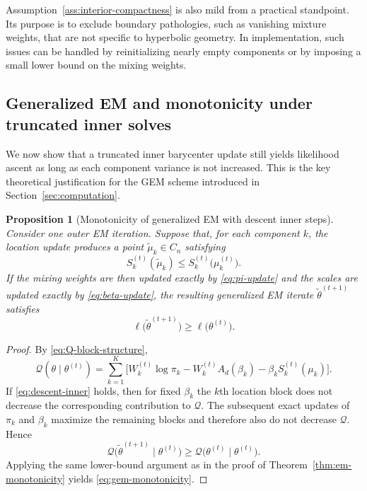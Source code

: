 \documentclass[11pt]{article}
\newtheorem{proposition}[theorem]{Proposition}
\begin{document}
Assumption~\ref{ass:interior-compactness} is also mild from a practical standpoint. Its purpose is to exclude boundary pathologies, such as vanishing mixture weights, that are not specific to hyperbolic geometry. In implementation, such issues can be handled by reinitializing nearly empty components or by imposing a small lower bound on the mixing weights.

\subsection{Generalized EM and monotonicity under truncated inner solves}\label{subsec:gem-theory}

We now show that a truncated inner barycenter update still yields likelihood ascent as long as each component variance is not increased. This is the key theoretical justification for the GEM scheme introduced in Section~\ref{sec:computation}.

\begin{proposition}[Monotonicity of generalized EM with descent inner steps]\label{prop:gem-monotone}
Consider one outer EM iteration. Suppose that, for each component \(k\), the location update produces a point \(\widetilde{\mu}_k\in C_n\) satisfying
\begin{equation}\label{eq:descent-inner}
S_k^{(t)}(\widetilde{\mu}_k)\le S_k^{(t)}\bigl(\mu_k^{(t)}\bigr).
\end{equation}
If the mixing weights are then updated exactly by \eqref{eq:pi-update} and the scales are updated exactly by \eqref{eq:beta-update}, the resulting generalized EM iterate \(\widetilde{\theta}^{(t+1)}\) satisfies
\begin{equation}\label{eq:gem-monotonicity}
\ell\bigl(\widetilde{\theta}^{(t+1)}\bigr)\ge \ell\bigl(\theta^{(t)}\bigr).
\end{equation}
\end{proposition}

\begin{proof}
By \eqref{eq:Q-block-structure},
\[
\mathcal{Q}(\theta\mid\theta^{(t)})
=
\sum_{k=1}^K
\Big[
W_k^{(t)}\log\pi_k
-
W_k^{(t)}A_d(\beta_k)
-
\beta_k S_k^{(t)}(\mu_k)
\Big].
\]
If \eqref{eq:descent-inner} holds, then for fixed \(\beta_k\) the \(k\)th location block does not decrease the corresponding contribution to \(\mathcal{Q}\). The subsequent exact updates of \(\pi_k\) and \(\beta_k\) maximize the remaining blocks and therefore also do not decrease \(\mathcal{Q}\). Hence
\[
\mathcal{Q}\bigl(\widetilde{\theta}^{(t+1)}\mid\theta^{(t)}\bigr)
\ge
\mathcal{Q}\bigl(\theta^{(t)}\mid\theta^{(t)}\bigr).
\]
Applying the same lower-bound argument as in the proof of Theorem~\ref{thm:em-monotonicity} yields \eqref{eq:gem-monotonicity}.
\end{proof}
\end{document}
